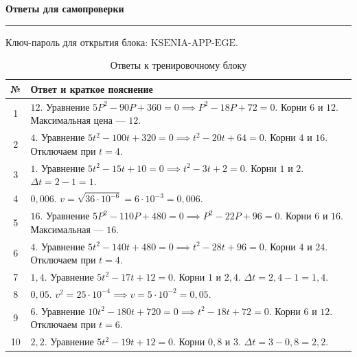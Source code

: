 \documentclass[a4paper,12pt]{article}
\newcommand{\SectionTitle}[1]{%
  \vspace{0.8em}
  {\Large\bfseries\textcolor{darkaccent}{#1}}\par
  \vspace{0.2em}
  {\color{accent}\rule{\linewidth}{0.8pt}}
  \vspace{0.4em}
}
\begin{document}
\newpage

\SectionTitle{Ответы для самопроверки}

\textcolor{muted}{Ключ-пароль для открытия блока: \(\text{KSENIA-APP-EGE}\).}

\vspace{0.6em}

\renewcommand{\arraystretch}{1.45}
\begin{table}[h]
\centering
\caption{Ответы к тренировочному блоку}
\begin{tabularx}{\linewidth}{@{}cX@{}}
\toprule
\textbf{№} & \textbf{Ответ и краткое пояснение} \\
\midrule
1 & $12$. Уравнение $5P^2 - 90P + 360 = 0 \implies P^2 - 18P + 72 = 0$. Корни $6$ и $12$. Максимальная цена — $12$. \\
2 & $4$. Уравнение $5t^2 - 100t + 320 = 0 \implies t^2 - 20t + 64 = 0$. Корни $4$ и $16$. Отключаем при $t=4$. \\
3 & $1$. Уравнение $5t^2 - 15t + 10 = 0 \implies t^2 - 3t + 2 = 0$. Корни $1$ и $2$. $\Delta t = 2 - 1 = 1$. \\
4 & $0{,}006$. $v = \sqrt{36 \cdot 10^{-6}} = 6 \cdot 10^{-3} = 0{,}006$. \\
5 & $16$. Уравнение $5P^2 - 110P + 480 = 0 \implies P^2 - 22P + 96 = 0$. Корни $6$ и $16$. Максимальная — $16$. \\
6 & $4$. Уравнение $5t^2 - 140t + 480 = 0 \implies t^2 - 28t + 96 = 0$. Корни $4$ и $24$. Отключаем при $t=4$. \\
7 & $1{,}4$. Уравнение $5t^2 - 17t + 12 = 0$. Корни $1$ и $2{,}4$. $\Delta t = 2{,}4 - 1 = 1{,}4$. \\
8 & $0{,}05$. $v^2 = 25 \cdot 10^{-4} \implies v = 5 \cdot 10^{-2} = 0{,}05$. \\
9 & $6$. Уравнение $10t^2 - 180t + 720 = 0 \implies t^2 - 18t + 72 = 0$. Корни $6$ и $12$. Отключаем при $t=6$. \\
10 & $2{,}2$. Уравнение $5t^2 - 19t + 12 = 0$. Корни $0{,}8$ и $3$. $\Delta t = 3 - 0{,}8 = 2{,}2$. \\
\bottomrule
\end{tabularx}
\end{table}
\end{document}
